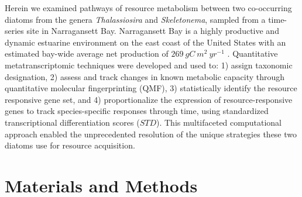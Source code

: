 Herein we examined pathways of resource metabolism between two co-occurring diatoms from the genera \textit{Thalassiosira} and \textit{Skeletonema}, sampled from a time-series site in Narragansett Bay. Narragansett Bay is a highly productive and dynamic estuarine environment on the east coast of the United States with an estimated bay-wide average net production of $269\ gC\ m^{2}\ yr^{-1}$ \citep{Oviatt1981}. Quantitative metatranscriptomic techniques were developed and used to: 1) assign taxonomic designation, 2) assess and track changes in known metabolic capacity through quantitative molecular fingerprinting (QMF), 3) statistically identify the resource responsive gene set, and 4) proportionalize the expression of resource-responsive genes to track species-specific responses through time, using standardized transcriptional differentiation scores ($STD$). This multifaceted computational approach enabled the unprecedented resolution of the unique strategies these two diatoms use for resource acquisition. \par
\section{Materials and Methods}
